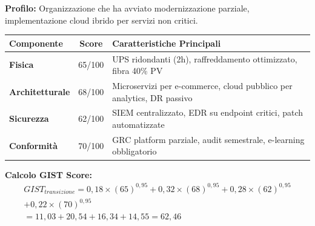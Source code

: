 \begin{tcolorbox}[
    colback=orange!5!white,
    colframe=orange!75!black,
    title={\textbf{Scenario 2:} GDO in Transizione Digitale},
    fonttitle=\bfseries,
    boxrule=1.5pt,
    arc=2mm,
    breakable,
    width=\textwidth
]

\textbf{Profilo:} Organizzazione che ha avviato modernizzazione parziale, implementazione cloud ibrido per servizi non critici.

\begin{center}
\sffamily
\begin{tabularx}{\textwidth}{l c X}
\toprule
\textbf{Componente} & \textbf{Score} & \textbf{Caratteristiche Principali} \\
\midrule
\textbf{Fisica} & 65/100 & UPS ridondanti (2h), raffreddamento ottimizzato, fibra 40\% PV \\
\textbf{Architetturale} & 68/100 & Microservizi per e-commerce, cloud pubblico per analytics, DR passivo \\
\textbf{Sicurezza} & 62/100 & SIEM centralizzato, EDR su endpoint critici, patch automatizzate \\
\textbf{Conformità} & 70/100 & GRC platform parziale, audit semestrale, e-learning obbligatorio \\
\bottomrule
\end{tabularx}
\end{center}

\textbf{Calcolo GIST Score:}
\begin{multline}
GIST_{transizione} = 0,18 \times (65)^{0,95} + 0,32 \times (68)^{0,95} + 0,28 \times (62)^{0,95} \\ + 0,22 \times (70)^{0,95} \\
= 11,03 + 20,54 + 16,34 + 14,55 = \boxed{62,46}
\end{multline}

\end{tcolorbox}

